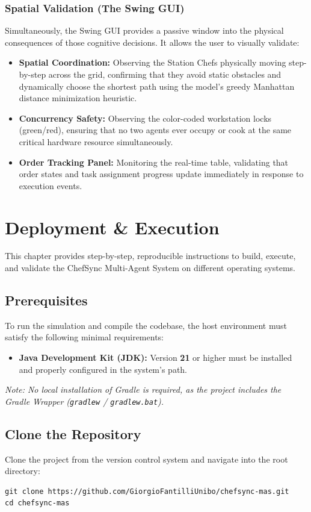 \documentclass{scrartcl}
\begin{document}
\subsubsection{Spatial Validation (The Swing GUI)}
Simultaneously, the Swing GUI provides a passive window into the physical consequences of those cognitive decisions. It allows the user to visually validate:
\begin{itemize}
\item \textbf{Spatial Coordination:} Observing the Station Chefs physically moving step-by-step across the grid, confirming that they avoid static obstacles and dynamically choose the shortest path using the model's greedy Manhattan distance minimization heuristic.
\item \textbf{Concurrency Safety:} Observing the color-coded workstation locks (green/red), ensuring that no two agents ever occupy or cook at the same critical hardware resource simultaneously.
\item \textbf{Order Tracking Panel:} Monitoring the real-time table, validating that order states and task assignment progress update immediately in response to execution events.
\end{itemize}
\clearpage


\newpage
\section{Deployment \& Execution}

This chapter provides step-by-step, reproducible instructions to build, execute, and validate the ChefSync Multi-Agent System on different operating systems.


\subsection{Prerequisites}
To run the simulation and compile the codebase, the host environment must satisfy the following minimal requirements:
\begin{itemize}
\item \textbf{Java Development Kit (JDK):} Version \textbf{21} or higher must be installed and properly configured in the system's path.
\end{itemize}

\textit{Note: No local installation of Gradle is required, as the project includes the Gradle Wrapper (\texttt{gradlew} / \texttt{gradlew.bat}).}


\subsection{Clone the Repository}
Clone the project from the version control system and navigate into the root directory:
\begin{lstlisting}[basicstyle=\footnotesize\ttfamily, breaklines=true]
git clone https://github.com/GiorgioFantilliUnibo/chefsync-mas.git
cd chefsync-mas
\end{lstlisting}
\end{document}
